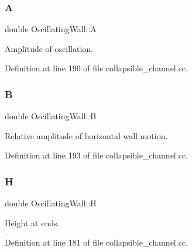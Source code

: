 \subsubsection{\texorpdfstring{A}{A}}
{\footnotesize\ttfamily double Oscillating\+Wall\+::A\hspace{0.3cm}{\ttfamily [private]}}



Amplitude of oscillation. 



Definition at line 190 of file collapsible\+\_\+channel.\+cc.

\mbox{\label{classOscillatingWall_a9db810649987a2011c7fe14d10b98b9a}} 
\subsubsection{\texorpdfstring{B}{B}}
{\footnotesize\ttfamily double Oscillating\+Wall\+::B\hspace{0.3cm}{\ttfamily [private]}}



Relative amplitude of horizontal wall motion. 



Definition at line 193 of file collapsible\+\_\+channel.\+cc.

\mbox{\label{classOscillatingWall_aa587e944cac9e501e6d3323731145b95}} 
\subsubsection{\texorpdfstring{H}{H}}
{\footnotesize\ttfamily double Oscillating\+Wall\+::H\hspace{0.3cm}{\ttfamily [private]}}



Height at ends. 



Definition at line 181 of file collapsible\+\_\+channel.\+cc.

\mbox{\label{classOscillatingWall_ac5e2ad6d5ef2992ba9295118787190e6}} 
